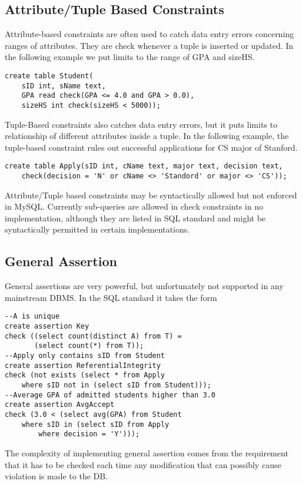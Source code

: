 \subsection{Attribute/Tuple Based Constraints}
Attribute-based constraints are often used to catch data entry errors concerning ranges of attributes. They are check whenever a tuple is inserted or updated. In the following example we put limits to the range of GPA and sizeHS. 
\begin{lstlisting}
create table Student(
	sID int, sName text,
	GPA read check(GPA <= 4.0 and GPA > 0.0),
	sizeHS int check(sizeHS < 5000));
\end{lstlisting}
Tuple-Based constraints also catches data entry errors, but it puts limits to relationship of different attributes inside a tuple. In the following example, the tuple-based constraint rules out successful applications for CS major of Stanford.  
\begin{lstlisting}
create table Apply(sID int, cName text, major text, decision text,
	check(decision = 'N' or cName <> 'Standord' or major <> 'CS'));
\end{lstlisting}
Attribute/Tuple based constraints may be syntactically allowed but not enforced in MySQL. Currently sub-queries are allowed in check constraints in no implementation, although they are listed in SQL standard and might be syntactically permitted in certain implementations.  
\subsection{General Assertion}
General assertions are very powerful, but unfortunately not supported in any mainstream DBMS. In the SQL standard it takes the form
\begin{lstlisting}
--A is unique
create assertion Key
check ((select count(distinct A) from T) =
       (select count(*) from T));
--Apply only contains sID from Student
create assertion ReferentialIntegrity
check (not exists (select * from Apply
	where sID not in (select sID from Student)));
--Average GPA of admitted students higher than 3.0
create assertion AvgAccept
check (3.0 < (select avg(GPA) from Student 
	where sID in (select sID from Apply 
		where decision = 'Y')));
\end{lstlisting}
The complexity of implementing general assertion comes from the requirement that it has to be checked each time any modification that can possibly cause violation is made to the DB.
